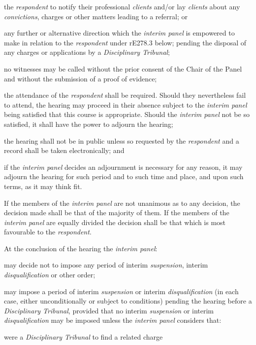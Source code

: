 the \emph{respondent} to notify their professional \emph{clients} and/or
lay \emph{clients} about any \emph{convictions}, charges or other
matters leading to a referral; or\\
\item  any further or alternative direction which the \emph{interim
panel }is empowered to make in relation to the \emph{respondent }under
rE278.3 below;\la
pending the disposal of any charges or applications by
a \emph{Disciplinary Tribunal};\item no witnesses may be called without the prior consent of the Chair of
the Panel and without the submission of a proof of evidence;\item the attendance of the \emph{respondent} shall be required. Should
they nevertheless fail to attend, the hearing may proceed in their
absence subject to the \emph{interim panel} being satisfied that this
course is appropriate. Should the \emph{interim panel} not be so
satisfied, it shall have the power to adjourn the hearing;\item the hearing shall not be in public unless so requested by
the \emph{respondent} and a record shall be taken electronically; and\item if the \emph{interim panel} decides an adjournment is necessary for
any reason, it may adjourn the hearing for such period and to such time
and place, and upon such terms, as it may think fit.\ln
{}\par
If the members of the \emph{interim panel} are not unanimous as to any
decision, the decision made shall be that of the majority of them. If
the members of the \emph{interim panel} are equally divided the decision
shall be that which is most favourable to the \emph{respondent}.\\
\par
At the conclusion of the hearing the \emph{interim panel}:\\\nl \item may decide not to impose any period of interim \emph{suspension},
interim \emph{disqualification} or other order;\item may impose a period of interim \emph{suspension} or
interim \emph{disqualification} (in each case, either unconditionally or
subject to conditions) pending the hearing before a \emph{Disciplinary
Tribunal}, provided that no interim \emph{suspension} or
interim \emph{disqualification} may be imposed unless the \emph{interim
panel }considers that:\al \item were a \emph{Disciplinary Tribunal} to find a related charge
